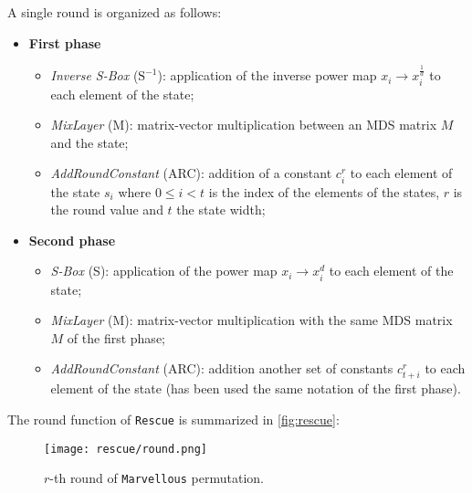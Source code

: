 \documentclass[12pt, a4paper]{report}
\begin{document}
A single round is organized as follows:
\begin{itemize}
  \item \textbf{First phase}
  \begin{itemize}
    \item \textit{Inverse S-Box} ($\text{S}^{-1}$): application of the inverse power map $x_i \rightarrow x_i^{\frac{1}{d}}$ to each element of the state;
    \item \textit{MixLayer} (M): matrix-vector multiplication between an MDS matrix $M$ and the state;
    \item \textit{AddRoundConstant} (ARC): addition of a constant $c^r_i$ to each element of the state $s_i$ where $0 \le i < t$ is the index of the elements of the states, $r$ is the round value and $t$ the state width;
  \end{itemize}
  \item \textbf{Second phase}
  \begin{itemize}
    \item \textit{S-Box} (S): application of the power map $x_i \rightarrow x_i^d$ to each element of the state;
    \item \textit{MixLayer} (M): matrix-vector multiplication with the same MDS matrix $M$ of the first phase;
    \item \textit{AddRoundConstant} (ARC): addition another set of constants $c^r_{t+i}$ to each element of the state (has been used the same notation of the first phase).
  \end{itemize}
\end{itemize}

The round function of \texttt{Rescue} is summarized in \autoref{fig:rescue}:
\begin{figure}[H]
  \begin{center}
    \hspace{30pt}
    \texttt{[image: rescue/round.png]}
  \end{center}
  \caption{$r$-th round of \texttt{Marvellous} permutation.}\label{fig:rescue}
\end{figure}
\end{document}
